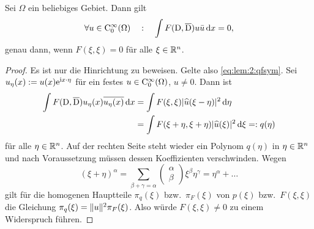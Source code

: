 \begin{lem}\label{lem:2:qfsym}
Sei $\Omega$ ein beliebiges Gebiet.
Dann gilt 
\begin{equation}\label{eq:lem:2:qfsym}
\forall u\in\mathrm C_0^\infty(\Omega) \quad:\quad \int F(\mathrm D,\overline{\mathrm D})u\bar{u}\,\mathrm d x=0,
\end{equation}
genau dann, wenn $F(\xi,\xi)=0$ für alle $\xi\in\mathbb R^n$.
\end{lem}
\begin{proof}
Es ist nur die Hinrichtung zu beweisen. Gelte also \eqref{eq:lem:2:qfsym}.
Sei $u_\eta(x):=u(x)\mathrm e^{\mathrm i {x}\cdot{\eta}}$ für ein festes $u\in \mathrm C^\infty_0(\Omega)$, $u\neq0$.
Dann ist
\begin{align}
\int F(\mathrm D,\overline{\mathrm D})u_\eta(x)\overline{u_\eta(x)}\,\mathrm d x
&=\int F(\xi,\xi)\lvert\widehat{u}(\xi-\eta)\rvert^2\,\mathrm d \eta\notag\\&
=\int F(\xi+\eta,\xi+\eta)\lvert\widehat{u}(\xi)\rvert^2\,\mathrm d \xi=:q(\eta)
\end{align}
für alle $\eta\in\mathbb R^n$.
Auf der rechten Seite steht wieder ein Polynom $q(\eta)$ in $\eta\in\mathbb R^n$
und nach Voraussetzung müssen dessen Koeffizienten verschwinden.
Wegen
\begin{equation}
(\xi+\eta)^\alpha=\sum_{\beta+\gamma=\alpha}\begin{pmatrix}\alpha\\\beta\end{pmatrix}\xi^\beta\eta^\gamma=\eta^\alpha+\dots
\end{equation}
gilt für die homogenen Hauptteile $\pi_q(\xi)$ bzw.~$\pi_F(\xi)$
von $p(\xi)$ bzw.~$F(\xi,\xi)$ die Gleichung $\pi_q(\xi)=\lVert u\rVert^2\pi_F(\xi)$.
Also würde $F(\xi,\xi)\neq0$ zu einem Widerspruch führen.
\end{proof}

